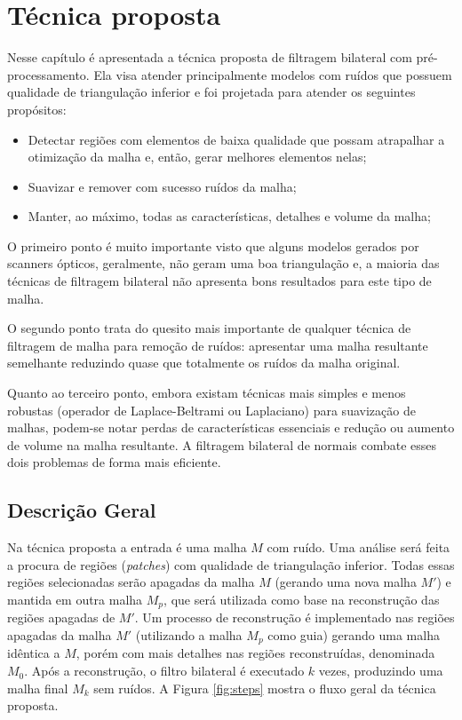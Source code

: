 \chapter{Técnica proposta}
\label{chap:tecnicaproposta}

Nesse capítulo é apresentada a técnica proposta de filtragem bilateral com pré-processamento. Ela visa atender principalmente modelos com ruídos que possuem qualidade de triangulação inferior e foi projetada para atender os seguintes propósitos:

\begin{itemize}  
\item Detectar regiões com elementos de baixa qualidade que possam atrapalhar a otimização da malha e, então, gerar melhores elementos nelas;
\item Suavizar e remover com sucesso ruídos da malha;
\item Manter, ao máximo, todas as características, detalhes e volume da malha;
\end{itemize}

O primeiro ponto é muito importante visto que alguns modelos gerados por scanners ópticos, geralmente, não geram uma boa triangulação e, a maioria das técnicas de filtragem bilateral não apresenta bons resultados para este tipo de malha.

O segundo ponto trata do quesito mais importante de qualquer técnica de filtragem de malha para remoção de ruídos: apresentar uma malha resultante semelhante reduzindo quase que totalmente os ruídos da malha original.

Quanto ao terceiro ponto, embora existam técnicas mais simples e menos robustas (operador de Laplace-Beltrami ou Laplaciano) para suavização de malhas, podem-se notar perdas de características essenciais e redução ou aumento de volume na malha resultante. A filtragem bilateral de normais combate esses dois problemas de forma mais eficiente.

\section{Descrição Geral}

Na técnica proposta a entrada é uma malha $M$ com ruído. Uma análise será feita a procura de regiões (\textit{patches}) com qualidade de triangulação inferior. Todas essas regiões selecionadas serão apagadas da malha $M$ (gerando uma nova malha $M'$) e mantida em outra malha $M_p$, que será utilizada como base na reconstrução das regiões apagadas de $M'$. Um processo de reconstrução é implementado nas regiões apagadas da malha $M'$ (utilizando a malha $M_p$ como guia) gerando uma malha idêntica a $M$, porém com mais detalhes nas regiões reconstruídas, denominada $M_0$. Após a reconstrução, o filtro bilateral é executado $k$ vezes, produzindo uma malha final $M_k$ sem ruídos. A Figura \ref{fig:steps} mostra o fluxo geral da técnica proposta.

